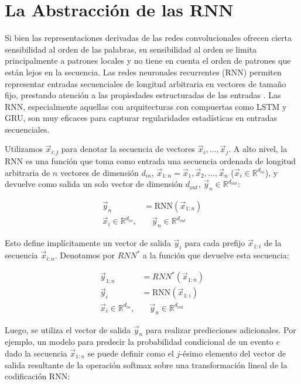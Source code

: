 
\section{La Abstracción de las RNN}

Si bien las representaciones derivadas de las redes convolucionales ofrecen cierta sensibilidad al orden de las palabras, su sensibilidad al orden se limita principalmente a patrones locales y no tiene en cuenta el orden de patrones que están lejos en la secuencia. Las redes neuronales recurrentes (RNN) permiten representar entradas secuenciales de longitud arbitraria en vectores de tamaño fijo, prestando atención a las propiedades estructuradas de las entradas \cite{goldberg2016primer}. Las RNN, especialmente aquellas con arquitecturas con compuertas como LSTM y GRU, son muy eficaces para capturar regularidades estadísticas en entradas secuenciales.

Utilizamos $\vec{x}_{i:j}$ para denotar la secuencia de vectores $\vec{x}_i, \dots, \vec{x}_j$. A alto nivel, la RNN es una función que toma como entrada una secuencia ordenada de longitud arbitraria de $n$ vectores de dimensión $d_{in}$, $\vec{x}_{1 :n}=\vec{x}_1,\vec{x}_2, \dots, \vec{x}_n$ ($\vec{x}_i \in \mathbb{R}^{d_{in}}$), y devuelve como salida un solo vector de dimensión $d_{out}$, $\vec{y}_n \in \mathbb{R}^{d_{out}}$:

\begin{equation}
\begin{split}
\vec{y}_n & = \text{RNN}(\vec{x}_{1:n}) \\
\vec{x}_i \in \mathbb{R}^{d_{in}}, & \quad \vec{y}_n \in \mathbb{R}^{d_{out}}
\end{split}
\end{equation}

Esto define implícitamente un vector de salida $\vec{y}_i$ para cada prefijo $\vec{x}_{1:i}$ de la secuencia $\vec{x}_{i:n}$. Denotamos por $RNN^{*}$ a la función que devuelve esta secuencia:

\begin{equation}
\begin{split}
\vec{y}_{1:n} & = RNN^{*}(\vec{x}_{1:n}) \\
\vec{y}_i & = \text{RNN}(\vec{x}_{1:i}) \\
\vec{x}_i \in \mathbb{R}^{d_{in}}, & \quad \vec{y}_n \in \mathbb{R}^{d_{out}}
\end{split}
\end{equation}

Luego, se utiliza el vector de salida $\vec{y}_n$ para realizar predicciones adicionales. Por ejemplo, un modelo para predecir la probabilidad condicional de un evento $e$ dado la secuencia $\vec{x}_{1:n}$ se puede definir como el $j$-ésimo elemento del vector de salida resultante de la operación softmax sobre una transformación lineal de la codificación RNN:

